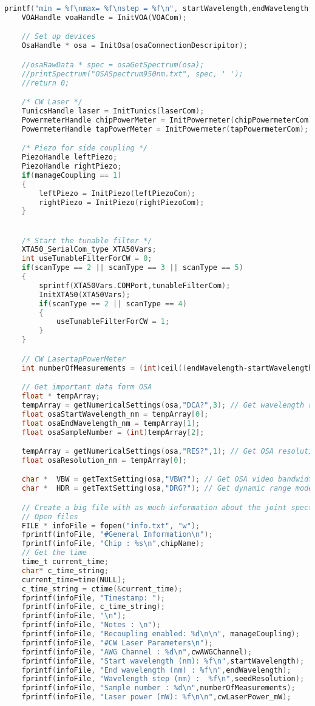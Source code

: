 \begin{lstlisting}[style=customc, language=C]
    printf("min = %f\nmax= %f\nstep = %f\n", startWavelength,endWavelength,seedResolution);
    VOAHandle voaHandle = InitVOA(VOACom);

    // Set up devices
    OsaHandle * osa = InitOsa(osaConnectionDescripitor);

    //osaRawData * spec = osaGetSpectrum(osa);
    //printSpectrum("OSASpectrum950nm.txt", spec, ' ');
    //return 0;

    /* CW Laser */
    TunicsHandle laser = InitTunics(laserCom);
    PowermeterHandle chipPowerMeter = InitPowermeter(chipPowermeterCom);
    PowermeterHandle tapPowerMeter = InitPowermeter(tapPowermeterCom);

    /* Piezo for side coupling */
    PiezoHandle leftPiezo;
    PiezoHandle rightPiezo;
    if(manageCoupling == 1)
    {
        leftPiezo = InitPiezo(leftPiezoCom);
        rightPiezo = InitPiezo(rightPiezoCom);
    }


    /* Start the tunable filter */
    XTA50_SerialCom_type XTA50Vars;
    int useTunableFilterForCW = 0;
    if(scanType == 2 || scanType == 3 || scanType == 5)
    {
        sprintf(XTA50Vars.COMPort,tunableFilterCom);
        InitXTA50(XTA50Vars);
        if(scanType == 2 || scanType == 4)
        {
            useTunableFilterForCW = 1;
        }
    }

    // CW LasertapPowerMeter
    int numberOfMeasurements = (int)ceil((endWavelength-startWavelength)/seedResolution)+1;

    // Get important data form OSA
    float * tempArray;
    tempArray = getNumericalSettings(osa,"DCA?",3); // Get wavelength range and sample number
    float osaStartWavelength_nm = tempArray[0];
    float osaEndWavelength_nm = tempArray[1];
    float osaSampleNumber = (int)tempArray[2];

    tempArray = getNumericalSettings(osa,"RES?",1); // Get OSA resolution
    float osaResolution_nm = tempArray[0];

    char *  VBW = getTextSetting(osa,"VBW?"); // Get OSA video bandwidth
    char *  HDR = getTextSetting(osa,"DRG?"); // Get dynamic range mode

    // Create a big file with as much information about the joint spectrum as possible
    // Open files
    FILE * infoFile = fopen("info.txt", "w");
    fprintf(infoFile, "#General Information\n");
    fprintf(infoFile, "Chip : %s\n",chipName);
    // Get the time
    time_t current_time;
    char* c_time_string;
    current_time=time(NULL);
    c_time_string = ctime(&current_time);
    fprintf(infoFile, "Timestamp: ");
    fprintf(infoFile, c_time_string);
    fprintf(infoFile, "\n");
    fprintf(infoFile, "Notes : \n");
    fprintf(infoFile, "Recoupling enabled: %d\n\n", manageCoupling);
    fprintf(infoFile, "#CW Laser Parameters\n");
    fprintf(infoFile, "AWG Channel : %d\n",cwAWGChannel);
    fprintf(infoFile, "Start wavelength (nm): %f\n",startWavelength);
    fprintf(infoFile, "End wavelength (nm) : %f\n",endWavelength);
    fprintf(infoFile, "Wavelength step (nm) :  %f\n",seedResolution);
    fprintf(infoFile, "Sample number : %d\n",numberOfMeasurements);
    fprintf(infoFile, "Laser power (mW): %f\n\n",cwLaserPower_mW);


\end{lstlisting}
